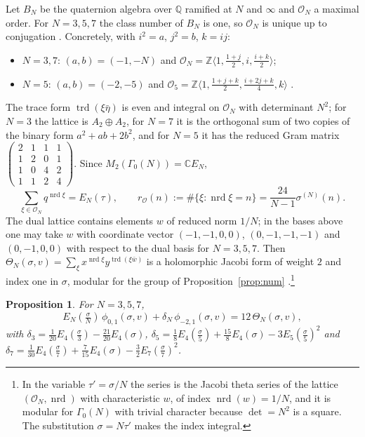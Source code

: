 \documentclass[11pt]{amsart}
\numberwithin{equation}{section}
\theoremstyle{plain}
\newtheorem{prop}[thm]{Proposition}
\theoremstyle{remark}
\newcommand{\Z}{\mathbb{Z}}
\newcommand{\Q}{\mathbb{Q}}
\newcommand{\C}{\mathbb{C}}
\newcommand{\cO}{\mathcal{O}}
\newcommand{\pmi}{\phi_{-2,1}}
\newcommand{\pz}{\phi_{0,1}}
\begin{document}
Let $B_N$ be the quaternion algebra over $\Q$ ramified at $N$ and $\infty$ and $\cO_N$ a maximal order. For $N=3,5,7$ the class number of $B_N$ is one, so $\cO_N$ is unique up to conjugation \cite[Chapter~25]{Voi21}. Concretely, with $i^2=a$, $j^2=b$, $k=ij$:
\begin{itemize}
\item $N=3,7$: $(a,b)=(-1,-N)$ and $\cO_N=\Z\langle1,\tfrac{1+j}{2},i,\tfrac{i+k}{2}\rangle$;
\item $N=5$: $(a,b)=(-2,-5)$ and $\cO_5=\Z\langle1,\tfrac{1+j+k}{2},\tfrac{i+2j+k}{4},k\rangle$ \cite{Piz80}.
\end{itemize}
The trace form $\operatorname{trd}(\xi\bar\eta)$ is even and integral on $\cO_N$ with determinant $N^2$; for $N=3$ the lattice is $A_2\oplus A_2$, for $N=7$ it is the orthogonal sum of two copies of the binary form $a^2+ab+2b^2$, and for $N=5$ it has the reduced Gram matrix $\left(\begin{smallmatrix}2&1&1&1\\1&2&0&1\\1&0&4&2\\1&1&2&4\end{smallmatrix}\right)$. Since $M_2(\Gamma_0(N))=\C E_N$,
\begin{equation}\label{eq:rO}
\sum_{\xi\in\cO_N}q^{\operatorname{nrd}\xi}=E_N(\tau),\qquad r_{\cO}(n):=\#\{\xi:\operatorname{nrd}\xi=n\}=\frac{24}{N-1}\sigma^{(N)}(n).
\end{equation}
The dual lattice contains elements $w$ of reduced norm $1/N$; in the bases above one may take $w$ with coordinate vector $(-1,-1,0,0)$, $(0,-1,-1,-1)$ and $(0,-1,0,0)$ with respect to the dual basis for $N=3,5,7$. Then $\Theta_N(\sigma,v)=\sum_\xi x^{\operatorname{nrd}\xi}y^{\operatorname{trd}(\xi\bar w)}$ is a holomorphic Jacobi form of weight $2$ and index one in $\sigma$, modular for the group of Proposition~\ref{prop:num} \cite[\S7]{EZ85}.\footnote{In the variable $\tau'=\sigma/N$ the series is the Jacobi theta series of the lattice $(\cO_N,\operatorname{nrd})$ with characteristic $w$, of index $\operatorname{nrd}(w)=1/N$, and it is modular for $\Gamma_0(N)$ with trivial character because $\det=N^2$ is a square. The substitution $\sigma=N\tau'$ makes the index integral.}

\begin{prop}\label{prop:theta}
For $N=3,5,7$,
\begin{equation}\label{eq:theta}
E_N(\tfrac\sigma N)\,\pz(\sigma,v)+\delta_N\,\pmi(\sigma,v)=12\,\Theta_N(\sigma,v),
\end{equation}
with $\delta_3=\tfrac{1}{20}E_4(\tfrac\sigma3)-\tfrac{21}{20}E_4(\sigma)$, $\delta_5=\tfrac18E_4(\tfrac\sigma5)+\tfrac{15}8E_4(\sigma)-3E_5(\tfrac\sigma5)^2$ and $\delta_7=\tfrac1{30}E_4(\tfrac\sigma7)+\tfrac7{15}E_4(\sigma)-\tfrac32E_7(\tfrac\sigma7)^2$.
\end{prop}
\end{document}
